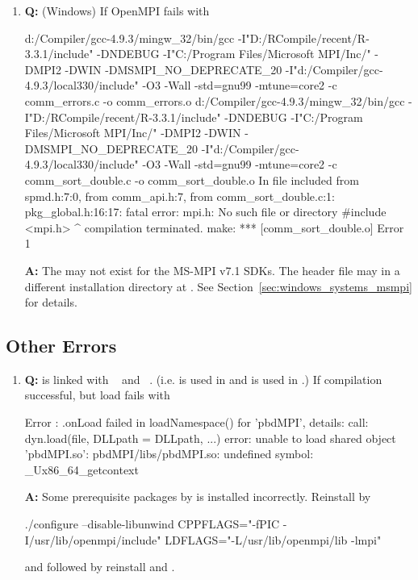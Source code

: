 \begin{enumerate}
\item {\bf\color{blue} Q:}
      (Windows) If OpenMPI  fails with
\begin{Error}
d:/Compiler/gcc-4.9.3/mingw_32/bin/gcc
    -I"D:/RCompile/recent/R-3.3.1/include" -DNDEBUG
    -I"C:/Program Files/Microsoft MPI/Inc/" -DMPI2 -DWIN
    -DMSMPI_NO_DEPRECATE_20    -I"d:/Compiler/gcc-4.9.3/local330/include"
    -O3 -Wall  -std=gnu99 -mtune=core2 -c comm_errors.c -o comm_errors.o
d:/Compiler/gcc-4.9.3/mingw_32/bin/gcc  -I"D:/RCompile/recent/R-3.3.1/include"
    -DNDEBUG -I"C:/Program Files/Microsoft MPI/Inc/" -DMPI2 -DWIN
    -DMSMPI_NO_DEPRECATE_20    -I"d:/Compiler/gcc-4.9.3/local330/include"
    -O3 -Wall  -std=gnu99 -mtune=core2 -c comm_sort_double.c
    -o comm_sort_double.o
In file included from spmd.h:7:0,
                 from comm_api.h:7,
                 from comm_sort_double.c:1:
pkg_global.h:16:17: fatal error: mpi.h: No such file or directory
 #include <mpi.h>
                 ^
compilation terminated.
make: *** [comm_sort_double.o] Error 1
\end{Error}
      {\bf\color{blue} A:}
      The  may not exist for the
      MS-MPI v7.1 SDKs. The header file may in a different installation
      directory at .
      See Section~\ref{sec:windows_systems_msmpi} for details.
\end{enumerate}


\subsection[Other Errors]{Other Errors}
\label{sec:other_errors}


\begin{enumerate}
\item {\bf\color{blue} Q:} 
       is linked with ~\citep{Chen2013pbdPROFpackage}
      and ~\citep{mpiP}.
      (i.e. \code{-} is used in  and
            \code{-} is used in .)
      If  compilation successful, but load fails with 
\begin{Error}
Error : .onLoad failed in loadNamespace() for 'pbdMPI', details:
  call: dyn.load(file, DLLpath = DLLpath, ...)
  error: unable to load shared object 'pbdMPI.so':
  pbdMPI/libs/pbdMPI.so: undefined symbol: _Ux86_64_getcontext
\end{Error}
      {\bf\color{blue} A:}
      Some prerequisite packages by  is installed incorrectly.
      Reinstall  by
\begin{Code}
./configure --disable-libunwind CPPFLAGS="-fPIC -I/usr/lib/openmpi/include" LDFLAGS="-L/usr/lib/openmpi/lib -lmpi"
\end{Code}
      and followed by reinstall  and .

\end{enumerate}
